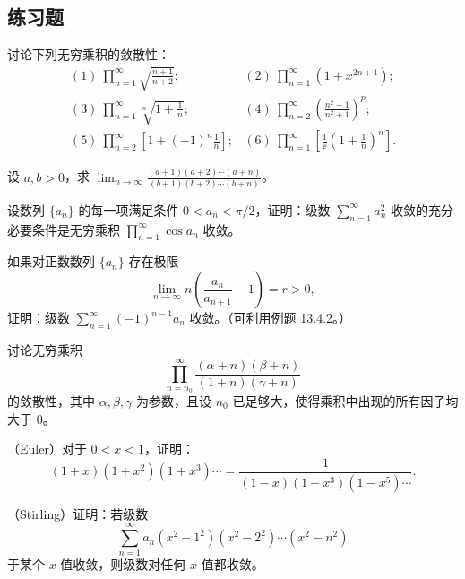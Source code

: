 \subsection{练习题}

\begin{xexercise}[1]
讨论下列无穷乘积的敛散性：
\[
\begin{array}{ll}
(1)\ \displaystyle\prod_{n=1}^{\infty}\sqrt{\frac{n+1}{n+2}};&
(2)\ \displaystyle\prod_{n=1}^{\infty}(1+x^{2n+1});\\[6pt]
(3)\ \displaystyle\prod_{n=1}^{\infty}\sqrt[n]{1+\frac1n};&
(4)\ \displaystyle\prod_{n=2}^{\infty}\left(\frac{n^2-1}{n^2+1}\right)^p;\\[6pt]
(5)\ \displaystyle\prod_{n=2}^{\infty}\left[1+(-1)^n\frac1n\right];&
(6)\ \displaystyle\prod_{n=1}^{\infty}\left[\frac1\ee\left(1+\frac1n\right)^n\right].
\end{array}
\]
\end{xexercise}

\begin{xexercise}[2]
设 $a,b>0$，求 $\lim_{n\to\infty}\frac{(a+1)(a+2)\cdots(a+n)}{(b+1)(b+2)\cdots(b+n)}$。
\end{xexercise}

\begin{xexercise}[3]
设数列 $\{a_n\}$ 的每一项满足条件 $0<a_n<\pi/2$，证明：级数 $\sum_{n=1}^{\infty}a_n^2$ 收敛的充分必要条件是无穷乘积 $\prod_{n=1}^{\infty}\cos a_n$ 收敛。
\end{xexercise}

\begin{xexercise}[4]
如果对正数数列 $\{a_n\}$ 存在极限
\[
\lim_{n\to\infty}n\left(\frac{a_n}{a_{n+1}}-1\right)=r>0,
\]
证明：级数 $\sum_{n=1}^{\infty}(-1)^{n-1}a_n$ 收敛。（可利用例题 13.4.2。）
\end{xexercise}

\begin{xexercise}[5]
讨论无穷乘积
\[
\prod_{n=n_0}^{\infty}\frac{(\alpha+n)(\beta+n)}{(1+n)(\gamma+n)}
\]
的敛散性，其中 $\alpha,\beta,\gamma$ 为参数，且设 $n_0$ 已足够大，使得乘积中出现的所有因子均大于 0。
\end{xexercise}

\begin{xexercise}[6]
（Euler）对于 $0<x<1$，证明：
\[
(1+x)(1+x^2)(1+x^3)\cdots=\frac1{(1-x)(1-x^3)(1-x^5)\cdots}.
\]
\end{xexercise}

\begin{xexercise}[7]
（Stirling）证明：若级数
\[
\sum_{n=1}^{\infty}a_n(x^2-1^2)(x^2-2^2)\cdots(x^2-n^2)
\]
于某个 $x$ 值收敛，则级数对任何 $x$ 值都收敛。
\end{xexercise}


